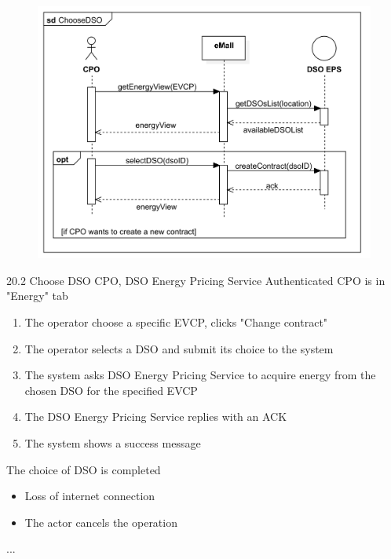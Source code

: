 \usecase
{
    \begin{figure}[H]
        \centering
        \includegraphics[scale=0.9]{src/sequence_diagram/retrievePrices&chooseDSO.png}
    \end{figure}
}
{20.2}
{Choose DSO} %
{CPO, DSO Energy Pricing Service} %
{Authenticated CPO is in "Energy" tab} %
{ %
    \begin{enumerate}
        \item The operator choose a specific EVCP, clicks "Change contract"
        \item The operator selects a DSO and submit its choice to the system
        \item The system asks DSO Energy Pricing Service to acquire energy from the chosen DSO for the specified EVCP
        \item The DSO Energy Pricing Service replies with an ACK
        \item The system shows a success message
    \end{enumerate}
}
{The choice of DSO is completed} %
{ %
    \begin{itemize}
        \item Loss of internet connection
        \item The actor cancels the operation
    \end{itemize}
}
{ %
    ...
}

